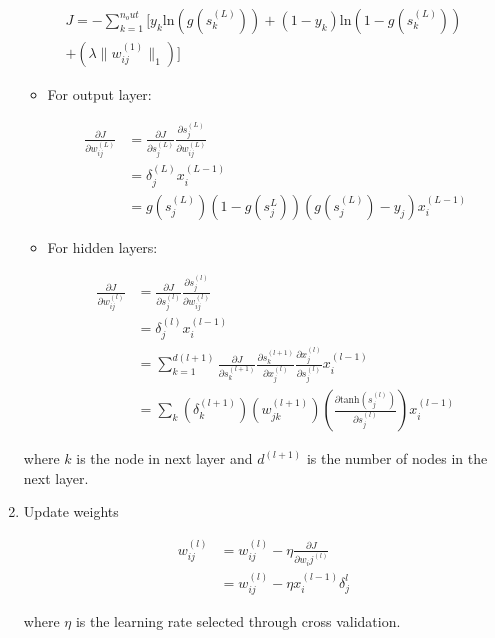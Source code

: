 \documentclass[conference]{IEEEtran}
\begin{document}
\begin{enumerate}
\begin{center}
\begin{align} \nonumber
J = -\sum_{k=1}^{n_out}[y_k \text{ln} (g(s_k^{(L)}))+(1-y_k) \text{ln} (1-g(s_k^{(L)}))\\
+ \left( \lambda \|w_{ij}^{(1)} \|_1 \right)]   
\end{align}
\end{center}
\begin{itemize}
\item For output layer:
\begin{center}
\begin{align}
\frac{\partial J}{\partial w_{ij}^{(L)}} &= \frac{\partial J}{\partial s_{j}^{(L)}}\frac{\partial s_{j}^{(L)}} {\partial w_{ij}^{(L)}}\\
&= \delta_j^{(L)}x_i^{(L-1)}\\
&= g(s_{j}^{(L)})(1-g(s_{j}^{L}))(g(s_{j}^{(L)})-y_j)x_i^{(L-1)}
\end{align}
\end{center}
\item For hidden layers:\\
\begin{center}
\begin{align}
\frac{\partial J}{\partial w_{ij}^{(l)}} &= \frac{\partial J}{\partial s_{j}^{(l)}}\frac{\partial s_{j}^{(l)}} {\partial w_{ij}^{(l)}}\\
&= \delta_j^{(l)}x_i^{(l-1)}\\
&= \sum_{k=1}^{d(l+1)}\frac{\partial J}{\partial s_k^{(l+1)}}\frac{\partial s_k^{(l+1)}}{\partial x_j^{(l)}}\frac{\partial x_j^{(l)}}{\partial s_j^{(l)}}x_i^{(l-1)}\\
&= \sum_k(\delta_k^{(l+1)})(w_{jk}^{(l+1)})(\frac{\partial \text{tanh}(s_j^{(l)})}{\partial s_j^{(l)}})x_i^{(l-1)}
\end{align}
\end{center}
\end{itemize}
where $k$ is the node in next layer and $d^{(l+1)}$ is the number of nodes in the next layer.
\item Update weights\\
\begin{center}
\begin{align}
w_{ij}^{(l)} &=  w_{ij}^{(l)} - \eta \frac{\partial J}{\partial w_ij^{(l)}}\\ 
&= w_{ij}^{(l)} - \eta x_i^{(l-1)}\delta_j^{l}
\end{align}
\end{center}
where $\eta$ is the learning rate selected through cross validation. 

\end{enumerate}
\end{document}
